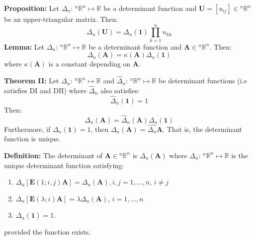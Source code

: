 \documentclass{article}
\newcommand{\bff}[1]{\mathbf{#1}}
\begin{document}
    \begin{minipage}[t]{0.45\linewidth}
        \textbf{Proposition:} Let $\Delta_n:\, {^n}\mathbb{R}^n \mapsto \mathbb{R}$ be a determinant function and $\bff{U} = [u_{ij}] \in {^n}\mathbb{R}^n$ be an upper-triangular matrix. Then:
        \begin{equation*}
            \Delta_n(\bff{U}) = \Delta_n(\bff{1})\prod_{k=1}^{n}u_{kk}
        \end{equation*}
        \textbf{Lemma:} Let $\Delta_n:\, {^n}\mathbb{R}^n \mapsto \mathbb{R}$ be a determinant function and $\bff{A} \in {^n}\mathbb{R}^n$. Then:
        \begin{equation*}
            \Delta_n(\bff{A})=\kappa(\bff{A})\Delta_n(\bff{1})
        \end{equation*}
        where $\kappa(\bff{A})$ is a constant depending on $\bff{A}$.
        \vspace{2mm}

        \textbf{Theorem II:} Let $\Delta_n:\, {^n}\mathbb{R}^n \mapsto \mathbb{R}$ and $\hat{\Delta}_n:\, {^n}\mathbb{R}^n \mapsto  \mathbb{R}$ be determinant functions (i.e satisfies DI and DII) where $\hat{\Delta}_n$ also satisfies:
        \begin{equation*}
            \hat{\Delta}_n(\bff{1})=1
        \end{equation*}
        Then:
        \begin{equation*}
            \Delta_n(\bff{A})=\hat{\Delta}_n(\bff{A})\Delta_n(\bff{1})
        \end{equation*}
        Furthermore, if $\Delta_n(\bff{1})=1$, then $\Delta_n(\bff{A}) = \hat{\Delta_n}\bff{A}$. That is, the determinant function is unique.
        \vspace{2mm}

        \textbf{Definition:} The determinant of $\bff{A} \in {^n}\mathbb{R}^n$ is $\Delta_n(\bff{A})$ where $\Delta_n:\, {^n}\mathbb{R}^n \mapsto \mathbb{R}$ is the unique determinant function satisfying:
        \begin{enumerate}[label=D\Roman*]
            \item $\Delta_n[\bff{E}(1;i,j)\bff{A}] = \Delta_n(\bff{A}), i,j=1,\dots,n$, $i\neq j$
            \item $\Delta_n[\bff{E}(\lambda;i)\bff{A}] = \lambda \Delta_n(\bff{A})$, $i=1,\dots, n$
            \item $\Delta_n(\bff{1})=1$.
        \end{enumerate}
        provided the function exists.
        \vspace{2mm}


\end{minipage}
\end{document}
